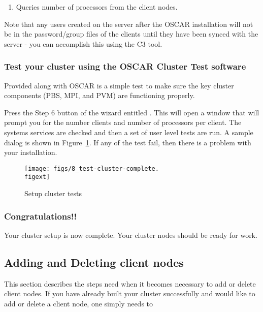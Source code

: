\begin{enumerate}
\item Queries number of processors from the client nodes.
  
\end{enumerate}

  Note that any users created on the server after the OSCAR
  installation will not be in the password/group files of the clients
  until they have been synced with the server - you can accomplish
  this using the C3  tool.


\subsubsection{Test your cluster using the OSCAR Cluster Test
  software}
\label{det:testcluster}
            
Provided along with OSCAR is a simple test to make sure the key
cluster components (PBS, MPI, and PVM) are functioning properly. 

\begchange
Press the Step 6 button of the wizard entitled . This will open a window that will prompt you for the number clients and number of processors per client. The systems  services are checked and then a set of user level tests are run. A sample dialog is shown in Figure~\ref{fig:detailed-setup-test}. If any of the test fail, then there is a problem with your installation.
\endchange 



\begin{figure}[htbp]
  \begin{center}
    \texttt{[image: figs/8\_test-cluster-complete.\\figext]}
    \caption{Setup cluster tests}
    \label{fig:detailed-setup-test}
  \end{center}
\end{figure}


\subsubsection{Congratulations!!}

Your cluster setup is now complete. Your cluster nodes should
be ready for work.

\begchange
\subsection{Adding and Deleting client nodes}
This section describes the steps need when it becomes necessary to add or delete
client nodes. If you have already built your cluster successfully and would like to add or delete a client node, one simply needs to  

